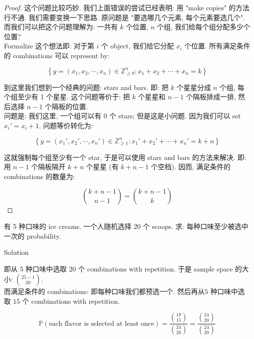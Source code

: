 \begin{proof}

这个问题比较巧妙. 我们上面错误的尝试已经表明: 用 "make copies" 的方法行不通. 我们需要变换一下思路. 原问题是 "要选哪几个元素, 每个元素要选几个". 而我们可以把这个问题理解为: 一共有 \(\mathit{k}\) 个位置, \(\mathit{n}\) 个组, 我们给每个组分配多少个位置?\\
Formalize 这个想法即: 对于第 \(\mathit{i}\) 个 object, 我们给它分配 \(\mathit{x}_{\mathit{i}}\) 个位置. 所有满足条件的 combinations 可以 represent by:

\[\left\{ {\mathit{y} = (\mathit{x}_{1},\mathit{x}_{2},\cdots,\mathit{x}_{\mathit{n}}) \in \mathbb{Z}_{\geq 0}^{\mathit{n}}:\mathit{x}_{1} + \mathit{x}_{2} + \cdots + \mathit{x}_{\mathit{n}} = \mathit{k}} \right\}\]

到这里我们想到一个经典的问题: stars and bars. 即: 把 \(\mathit{k}\) 个星星分成 \(\mathit{n}\) 个组, 每个组至少有 1 个星星. 这个问题等价于: 把 \(\mathit{k}\) 个星星和 \(\mathit{n} - 1\) 个隔板排成一排, 然后选择 \(\mathit{n} - 1\) 个隔板的位置.\\
问题是: 我们这里, 一个组可以有 \(0\) 个 stars; 但是这是小问题. 因为我们可以 set \(\mathit{x}_{\mathit{i}}' = \mathit{x}_{\mathit{i}} + 1\), 问题等价转化为:

\[\left\{ {\mathit{y} = (\mathit{x}_{1}',\mathit{x}_{2}',\cdots,\mathit{x}_{\mathit{n}}') \in \mathbb{Z}_{\geq 1}^{\mathit{n}}:\mathit{x}_{1}' + \mathit{x}_{2}' + \cdots + \mathit{x}_{\mathit{n}}' = \mathit{k} + \mathit{n}} \right\}\]

这就强制每个组至少有一个 star, 于是可以使用 stars and bars 的方法来解决. 即: 用 \(\mathit{n} - 1\) 个隔板隔开 \(\mathit{k} + \mathit{n}\) 个星星 (有 \(\mathit{k} + \mathit{n} - 1\) 个空档). 因而, 满足条件的 combinations 的数量为:

\[\binom{\mathit{k} + \mathit{n} - 1}{\mathit{n} - 1} = \binom{\mathit{k} + \mathit{n} - 1}{\mathit{k}}\]

\end{proof}

\begin{example}

有 5 种口味的 ice creams. 一个人随机选择 20 个 scoops. 求: 每种口味至少被选中一次的 probability.

\end{example}

\begin{qlsolution}{Solution}

即从 \(5\) 种口味中选取 \(20\) 个 combinations with repetition. 于是 sample space 的大小: \(\binom{25 - 1}{20}\).\\
而满足条件的 combinations: 即每种口味我们都预选一个. 然后再从\(5\) 种口味中选取 \(15\) 个 combinations with repetition.

\[\mathbb{P}(\text{each flavor is selected at least once}) = \frac{\binom{19}{15}}{\binom{24}{20}} = \frac{\binom{24}{20}}{\binom{24}{20}}\]

\end{qlsolution}

